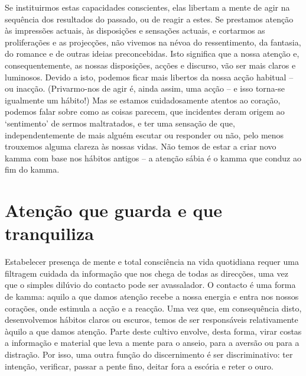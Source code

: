Se instituirmos estas capacidades conscientes, elas libertam a mente de agir na
sequência dos resultados do passado, ou de reagir a estes. Se prestamos atenção
às impressões actuais, às disposições e sensações actuais, e cortarmos as
proliferações e as projecções, não vivemos na névoa do ressentimento, da
fantasia, do romance e de outras ideias preconcebidas. Isto significa que a
nossa atenção e, consequentemente, as nossas disposições, acções e discurso, vão
ser mais claros e luminosos. Devido a isto, podemos ficar mais libertos da nossa
acção habitual -- ou inacção. (Privarmo-nos de agir é, ainda assim, uma acção --
e isso torna-se igualmente um hábito!) Mas se estamos cuidadosamente atentos ao
coração, podemos falar sobre como as coisas parecem, que incidentes deram origem
ao `sentimento' de sermos maltratados, e ter uma sensação de que,
independentemente de mais alguém escutar ou responder ou não, pelo menos
trouxemos alguma clareza às nossas vidas. Não temos de estar a criar novo kamma
com base nos hábitos antigos -- a atenção sábia é o kamma que conduz ao fim do
kamma.

\section{Atenção que guarda e que tranquiliza}

Estabelecer presença de mente e total consciência na vida quotidiana requer uma
filtragem cuidada da informação que nos chega de todas as direcções, uma vez que
o simples dilúvio do contacto pode ser avassalador. O contacto é uma forma de
kamma: aquilo a que damos atenção recebe a nossa energia e entra nos nossos
corações, onde estimula a acção e a reacção.
Uma vez que, em consequência disto, desenvolvemos hábitos claros ou escuros,
temos de ser responsáveis relativamente àquilo a que damos atenção. Parte deste
cultivo envolve, desta forma, virar costas a informação e material que leva a
mente para o anseio, para a aversão ou para a distração. Por isso, uma outra
função do discernimento é ser discriminativo: ter intenção, verificar, passar a
pente fino, deitar fora a escória e reter o ouro.

